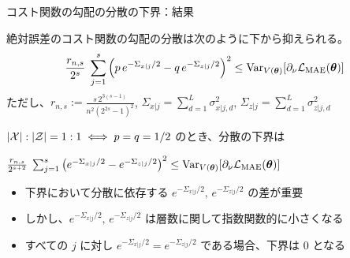 \documentclass[dvipdfmx,10pt,aspectratio=169]{beamer}
\begin{document}
\begin{frame}{コスト関数の勾配の分散の下界：結果}
    \begin{theorem}
        絶対誤差のコスト関数の勾配の分散は次のように下から抑えられる。
        \begin{align*}
            \frac{r_{n,s}}{2^s}\;
            \sum_{j=1}^s \qty(p\,e^{-\Sigma_{x|j}/2} - q\,e^{-\Sigma_{z|j}/2})^2
            \leq \operatorname{Var}_{V(\vb*{\theta})}[\partial_\nu\mathcal{L}_{\mathrm{MAE}}(\vb*{\theta})]
        \end{align*}
        ただし、$r_{n,s} := \frac{s\,2^{3(s-1)}}{n^2(2^{2s}-1)^2}$, $\Sigma_{x|j} = \sum_{d=1}^L \sigma_{x|j,d}^2$, $\Sigma_{z|j} = \sum_{d=1}^L \sigma_{z|j,d}^2$
    \end{theorem}
    
    $|\mathcal{X}|:|\mathcal{Z}| = 1:1 \iff p = q = 1/2$ のとき、分散の下界は
    
    \begin{center}
        $
        \frac{r_{n,s}}{2^{s+2}}\;
        \sum_{j=1}^s
        \qty(e^{-\Sigma_{x|j}/2}- e^{-\Sigma_{z|j}/2})^2
        \leq \operatorname{Var}_{V(\vb*{\theta})}[\partial_\nu\mathcal{L}_{\mathrm{MAE}}(\vb*{\theta})]
        $
    \end{center}

    \begin{itemize}
        \item 下界において分散に依存する $e^{-\Sigma_{x|j}/2},\,e^{-\Sigma_{z|j}/2}$ の差が重要
        \item しかし、$e^{-\Sigma_{x|j}/2},\,e^{-\Sigma_{z|j}/2}$ は層数に関して指数関数的に小さくなる
        \item すべての $j$ に対し $e^{-\Sigma_{x|j}/2} = e^{-\Sigma_{z|j}/2}$ である場合、下界は $0$ となる
    \end{itemize}
\end{frame}
\end{document}
